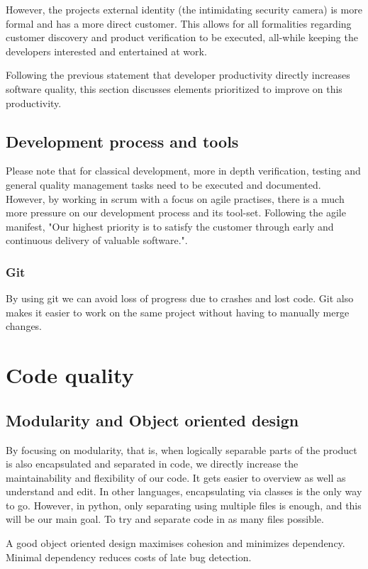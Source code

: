 \documentclass{article}
\begin{document}
However, the projects external identity (the intimidating security camera) is more formal and has a more direct customer.
This allows for all formalities regarding customer discovery and product verification to be executed, all-while keeping the developers interested and entertained at work.

Following the previous statement that developer productivity directly increases software quality, this section discusses elements prioritized to improve on this productivity.

\subsection{Development process and tools}
Please note that for classical development, more in depth verification, testing and general quality management tasks need to be executed and documented.
However, by working in scrum with a focus on agile practises, there is a much more pressure on our development process and its tool-set.
Following the agile manifest, "Our highest priority is to satisfy the customer through early and continuous delivery of valuable software.".

\subsubsection{Git}
By using git we can avoid loss of progress due to crashes and lost code.
Git also makes it easier to work on the same project without having to manually merge changes.


\section{Code quality}

\subsection{Modularity and Object oriented design}
By focusing on modularity, that is, when logically separable parts of the product is also encapsulated and separated in code, we directly increase the maintainability and flexibility of our code.
It gets easier to overview as well as understand and edit. In other languages, encapsulating via classes is the only way to go. However, in python, only separating using multiple files is enough, and this will be our main goal. To try and separate code in as many files possible.

A good object oriented design maximises cohesion and minimizes dependency.
Minimal dependency reduces costs of late bug detection.
\end{document}
